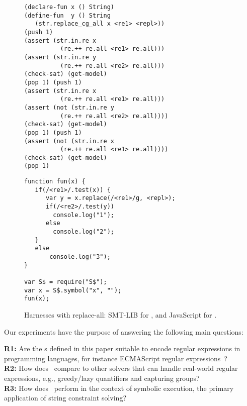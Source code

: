\begin{figure}[tb]
  \scriptsize

  \begin{minipage}{0.49\linewidth}
\begin{verbatim}
(declare-fun x () String)
(define-fun  y () String
   (str.replace_cg_all x <re1> <repl>))
(push 1)
(assert (str.in.re x 
          (re.++ re.all <re1> re.all)))
(assert (str.in.re y 
          (re.++ re.all <re2> re.all)))
(check-sat) (get-model)
(pop 1) (push 1)
(assert (str.in.re x 
          (re.++ re.all <re1> re.all)))
(assert (not (str.in.re y 
          (re.++ re.all <re2> re.all))))
(check-sat) (get-model)
(pop 1) (push 1)
(assert (not (str.in.re x 
          (re.++ re.all <re1> re.all))))
(check-sat) (get-model)
(pop 1)
\end{verbatim}
  \end{minipage}\hfill
  \raisebox{-25ex}{\rule{0.4pt}{52ex}}\hfill
  \begin{minipage}{0.49\linewidth}
\begin{verbatim}
function fun(x) {
   if(/<re1>/.test(x)) {
      var y = x.replace(/<re1>/g, <repl>);
      if(/<re2>/.test(y))
        console.log("1");
      else
        console.log("2");
   }
   else
       console.log("3");
}

var S$ = require("S$");
var x = S$.symbol("x", "");
fun(x);
\end{verbatim}
  \end{minipage}
  
  \caption{Harnesses with replace-all: SMT-LIB for \ostrich,
    and JavaScript for \expose{}.}
  \label{fig:harness}
  
\end{figure}

Our experiments have the purpose of answering the following main questions:

\medskip
\noindent
\textbf{R1:} Are the  {\regexp}s defined in this paper
suitable to encode regular expressions in programming languages,
for instance ECMAScript regular expressions~\cite{ECMAScript11}?
\\
\textbf{R2:} How does \ostrich\ compare to other solvers that can
handle real-world regular expressions, e.g., greedy/lazy
quantifiers and capturing groups?
\\
\textbf{R3:} How does \ostrich\ perform in the context of symbolic execution,
the primary application of string constraint solving?

